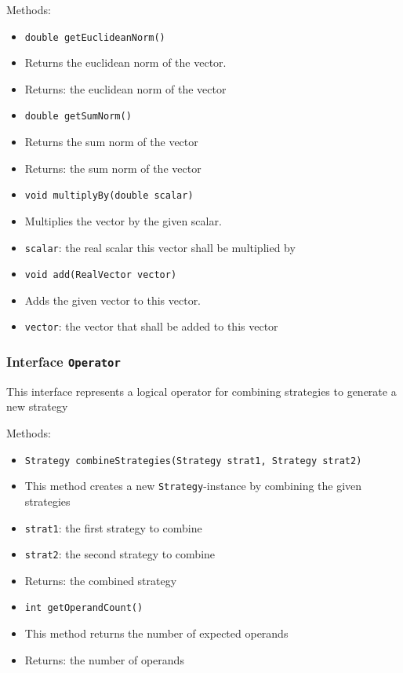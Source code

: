 \documentclass[parskip=full,11pt]{scrartcl}
\begin{document}
Methods:
\begin{itemize}\itemsep -10pt
\item \texttt{double getEuclideanNorm()}
\item[] Returns the euclidean norm of the vector.
\item[] Returns: the euclidean norm of the vector

\item \texttt{double getSumNorm()}
\item[] Returns the sum norm of the vector
\item[] Returns: the sum norm of the vector

\item \texttt{void multiplyBy(double scalar)}
\item[] Multiplies the vector by the given scalar.
\item[] \texttt{scalar}: the real scalar this vector shall be multiplied by

\item \texttt{void add(RealVector vector)}
\item[] Adds the given vector to this vector.
\item[] \texttt{vector}: the vector that shall be added to this vector
\end{itemize}

\subsubsection{Interface \texttt{Operator}}

This interface represents a logical operator for combining strategies to generate a new strategy

Methods:
\begin{itemize}\itemsep -10pt
	\item \texttt{Strategy combineStrategies(Strategy strat1, Strategy strat2)}
	\item[] This method creates a new \texttt{Strategy}-instance by combining the given strategies
	\item[] \texttt{strat1}: the first strategy to combine
	\item[] \texttt{strat2}: the second strategy to combine
	\item[] Returns: the combined strategy

	\item \texttt{int getOperandCount()}
	\item[] This method returns the number of expected operands
	\item[] Returns: the number of operands
\end{itemize}
\end{document}
